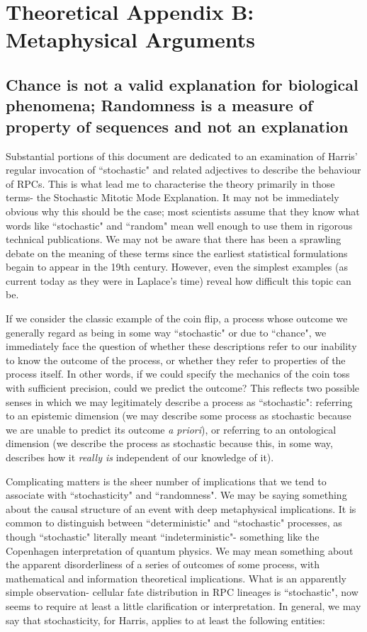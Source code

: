\chapter{Theoretical Appendix B: Metaphysical Arguments}
\section{Chance is not a valid explanation for biological phenomena; Randomness is a measure of property of sequences and not an explanation}
\label{sec:chance}
Substantial portions of this document are dedicated to an examination of Harris' regular invocation of ``stochastic" and related adjectives to describe the behaviour of RPCs. This is what lead me to characterise the theory primarily in those terms- the Stochastic Mitotic Mode Explanation. It may not be immediately obvious why this should be the case; most scientists assume that they know what words like ``stochastic" and ``random" mean well enough to use them in rigorous technical publications. We may not be aware that there has been a sprawling debate on the meaning of these terms since the earliest statistical formulations begain to appear in the 19th century. However, even the simplest examples (as current today as they were in Laplace's time) reveal how difficult this topic can be.

If we consider the classic example of the coin flip, a process whose outcome we generally regard as being in some way ``stochastic" or due to ``chance", we immediately face the question of whether these descriptions refer to our inability to know the outcome of the process, or whether they refer to properties of the process itself. In other words, if we could specify the mechanics of the coin toss with sufficient precision, could we predict the outcome? This reflects two possible senses in which we may legitimately describe a process as ``stochastic": referring to an epistemic dimension (we may describe some process as stochastic because we are unable to predict its outcome \textit{a priori}), or referring to an ontological dimension (we describe the process as stochastic because this, in some way, describes how it \textit{really is} independent of our knowledge of it).

Complicating matters is the sheer number of implications that we tend to associate with ``stochasticity" and ``randomness". We may be saying something about the causal structure of an event with deep metaphysical implications. It is common to distinguish between ``deterministic" and ``stochastic" processes, as though ``stochastic" literally meant ``indeterministic"- something like the Copenhagen interpretation of quantum physics. We may mean something about the apparent disorderliness of a series of outcomes of some process, with mathematical and information theoretical implications. What is an apparently simple observation- cellular fate distribution in RPC lineages is ``stochastic", now seems to require at least a little clarification or interpretation. In general, we may say that stochasticity, for Harris, applies to at least the following entities:

